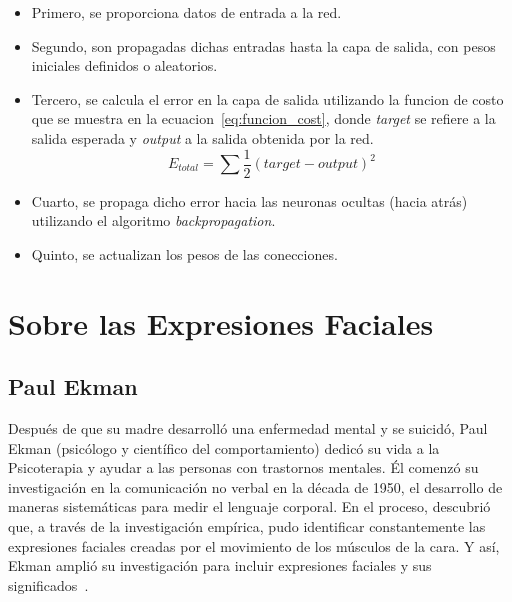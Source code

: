 \begin{itemize}
\item Primero, se proporciona datos de entrada a la red.
\item Segundo, son propagadas dichas entradas hasta la capa de salida, con pesos iniciales definidos o
aleatorios.
\item Tercero, se calcula el error en la capa de salida utilizando la funcion de costo que se muestra en la ecuacion~\ref{eq:funcion_cost}, donde \textit{target} se refiere a la salida esperada y \textit{output} a la salida obtenida por la red.
\begin{equation}\label{eq:funcion_cost}
E_{total} = \sum \frac{1}{2}(target - output)^2
\end{equation}
\item Cuarto, se propaga dicho error hacia las neuronas ocultas (hacia atrás) utilizando el algoritmo \textit{backpropagation}.
\item Quinto, se actualizan los pesos de las conecciones.
\end{itemize}

\section{Sobre las Expresiones Faciales}
\subsection{Paul Ekman}

Después de que su madre desarrolló una enfermedad mental y se suicidó, Paul Ekman (psicólogo y científico del comportamiento) dedicó su vida a la Psicoterapia y ayudar a las personas con trastornos mentales. Él comenzó su investigación en la comunicación no verbal en la década de 1950, el desarrollo de maneras sistemáticas para medir el lenguaje corporal. En el proceso, descubrió que, a través de la investigación empírica, pudo identificar constantemente las expresiones faciales creadas por el movimiento de los músculos de la cara. Y así, Ekman amplió su investigación para incluir expresiones faciales y sus significados~\cite{29ekman2016scientists}.


